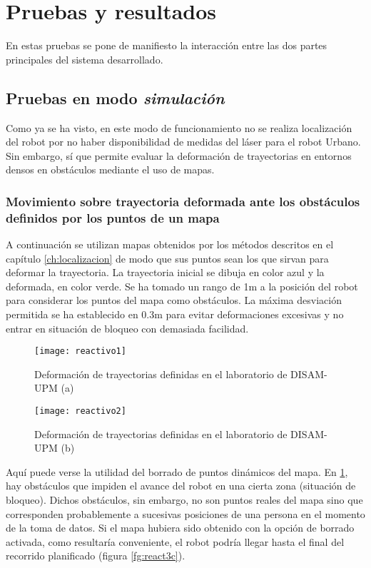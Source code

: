 \section{Pruebas y resultados}
En estas pruebas se pone de manifiesto la interacción entre las dos partes principales del sistema desarrollado.

\subsection{Pruebas en modo \emph{simulación}}
Como ya se ha visto, en este modo de funcionamiento no se realiza localización del robot por no haber disponibilidad de medidas del láser para el robot Urbano. Sin embargo, sí que permite evaluar la deformación de trayectorias en entornos densos en obstáculos mediante el uso de mapas.

\subsubsection{Movimiento sobre trayectoria deformada ante los obstáculos definidos por los puntos de un mapa}
A continuación se utilizan mapas obtenidos por los métodos descritos en el capítulo \ref{ch:localizacion} de modo que sus puntos sean los que sirvan para deformar la trayectoria. La trayectoria inicial se dibuja en color azul y la deformada, en color verde. Se ha tomado un rango de 1m a la posición del robot para considerar los puntos del mapa como obstáculos. La máxima desviación permitida se ha establecido en 0.3m para evitar deformaciones excesivas y no entrar en situación de bloqueo con demasiada facilidad.%

\begin{figure}[htb]
  \centering\texttt{[image: reactivo1]}
   \caption{Deformación de trayectorias definidas en el laboratorio de DISAM-UPM (a)}\label{fg:react3a}
\end{figure}

\begin{figure}[htb]
  \centering\texttt{[image: reactivo2]}
  \caption{Deformación de trayectorias definidas en el laboratorio de DISAM-UPM (b)}\label{fg:react3b}
\end{figure}

\clearpage
Aquí puede verse la utilidad del borrado de puntos dinámicos del mapa. En \ref{fg:react3a}, hay obstáculos que impiden el avance del robot en una cierta zona (situación de bloqueo). Dichos obstáculos, sin embargo, no son puntos reales del mapa sino que corresponden probablemente a sucesivas posiciones de una persona en el momento de la toma de datos. Si el mapa hubiera sido obtenido con la opción de borrado activada, como resultaría conveniente, el robot podría llegar hasta el final del recorrido planificado (figura \ref{fg:react3c}).

